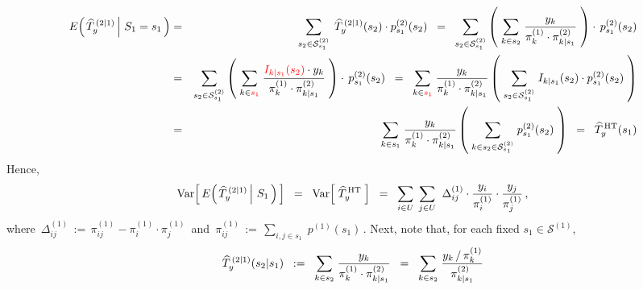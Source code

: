 \begin{enumerate}
\begin{eqnarray*}
	\end{eqnarray*}
	\begin{eqnarray*}
	E\!\left(\left.\widehat{T}^{\,(2 \vert 1)}_{y} \,\right\vert\, S_{1} = s_{1} \,\right)
	& = &
		\underset{s_{2} \in \mathcal{S}^{(2)}_{s_{1}}}{\sum}\;\,
		\widehat{T}^{\,(2 \vert 1)}_{y}(s_{2}) \cdot p^{(2)}_{s_{1}}(s_{2})
	\;\; = \;\;
		\underset{s_{2} \in \mathcal{S}^{(2)}_{s_{1}}}{\sum}
		\left(\;
			\underset{k \in s_{2}}{\sum}\;\dfrac{y_{k}}{ \pi^{(1)}_{k} \cdot \pi^{(2)}_{k \vert s_{1}} }
		\;\right)
		\cdot\,
		p^{(2)}_{s_{1}}(s_{2})
	\\
	& = &
		\underset{s_{2} \in \mathcal{S}^{(2)}_{s_{1}}}{\sum}
		\left(\;
			\underset{k \in {\color{red}s_{1}}}{\sum}\;
			\dfrac{ {\color{red}I_{k \vert s_{1}}(s_{2})} \cdot y_{k} }{ \pi^{(1)}_{k} \cdot \pi^{(2)}_{k \vert s_{1}} }
		\;\right)
		\cdot\,
		p^{(2)}_{s_{1}}(s_{2})
	\;\; = \;\;
		\underset{k \in {\color{red}s_{1}}}{\sum}\;
		\dfrac{ y_{k} }{ \pi^{(1)}_{k} \cdot \pi^{(2)}_{k \vert s_{1}} }
			\left(\;
				\underset{s_{2} \in \mathcal{S}^{(2)}_{s_{1}}}{\sum}\;
				I_{k \vert s_{1}}(s_{2}) \cdot p^{(2)}_{s_{1}}(s_{2})
			\;\right)
	\\
	& = &
		\underset{k \in s_{1}}{\sum}\;
		\dfrac{ y_{k} }{ \pi^{(1)}_{k} \cdot \pi^{(2)}_{k \vert s_{1}} }
			\left(\;
				\underset{k \in s_{2} \in \mathcal{S}^{(2)}_{s_{1}}}{\sum}\; p^{(2)}_{s_{1}}(s_{2})
			\;\right)
	\;\; = \;\;
		\widehat{T}^{\,\textnormal{HT}}_{y}(s_{1})
	\end{eqnarray*}
	Hence,
	\begin{equation*}
	\textnormal{Var}\!\left[\, E\!\left(\left.\widehat{T}^{\,(2 \vert 1)}_{y} \,\right\vert\, S_{1} \,\right) \,\right]
	\;\; = \;\;
		\textnormal{Var}\!\left[\; \widehat{T}^{\,\textnormal{HT}}_{y} \;\right]
	\;\; = \;\;
		\underset{i \in U}{\sum}\;\,
		\underset{j \in U}{\sum}\;\;
		\Delta^{(1)}_{ij} \cdot \dfrac{y_{i}}{\pi^{(1)}_{i}} \cdot \dfrac{y_{j}}{\pi^{(1)}_{j}}\,,
	\end{equation*}
	where
	\,$\Delta^{(1)}_{ij} \, := \, \pi^{(1)}_{ij} - \pi^{(1)}_{i} \cdot \pi^{(1)}_{j}$\,
	and
	\,$\pi^{(1)}_{ij} \, := \, \underset{i,j \in s_{1}}{\sum}\; p^{(1)}(s_{1})$\,.
	Next, note that, for each fixed $s_{1} \in \mathcal{S}^{(1)}$,
	\begin{equation*}
	\widehat{T}^{\,(2 \vert 1)}_{y}(s_{2} \vert s_{1})
	\;\; := \;\;
		\underset{k \in s_{2}}{\sum}\;\dfrac{y_{k}}{ \pi^{(1)}_{k} \cdot \pi^{(2)}_{k \vert s_{1}} }
	\;\; = \;\;
		\underset{k \in s_{2}}{\sum}\;\dfrac{ y_{k} \,/\, \pi^{(1)}_{k} }{ \pi^{(2)}_{k \vert s_{1}} }
	\end{equation*}

\end{enumerate}
